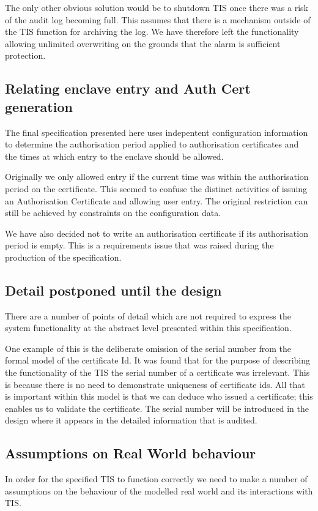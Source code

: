 The only other obvious solution would be to shutdown TIS once there
was a risk of the audit log becoming full. This assumes that there is
a mechanism outside of the TIS function for archiving the log. 
We have therefore left the functionality allowing unlimited
overwriting on the grounds that the alarm is sufficient protection.

\subsection{Relating enclave entry and Auth Cert generation}

The final specification presented here uses indepentent configuration
information to determine the authorisation period applied to
authorisation certificates and the times at which entry to the enclave
should be allowed. 

Originally we only allowed entry if the current time was within the
authorisation period on the certificate. This seemed to confuse the
distinct activities of issuing an Authorisation Certificate and
allowing user entry. The original restriction can still be achieved by
constraints on the configuration data.

We have also decided not to write an authorisation certificate if its
authorisation period is empty. This is a requirements issue that was
raised during the production of the specification.

\subsection{Detail postponed until the design}

There are a number of points of detail which are not required to
express the system functionality at the abstract level presented
within this specification. 

One example of this is the deliberate omission of the serial number
from the formal model of the certificate Id. It was found that for the
purpose of describing the functionality of the TIS the serial number
of a certificate was irrelevant. This is because there is no need to
demonstrate uniqueness of certificate ids. All that is important
within this model is that we can deduce who issued a certificate; this
enables us to validate the certificate. The serial number will be
introduced in the design where it appears in the detailed information
that is audited. 

\subsection{Assumptions on Real World behaviour}
In order for the specified TIS to function correctly we need to make a
number of assumptions on the behaviour of the modelled real world and
its interactions with TIS.

